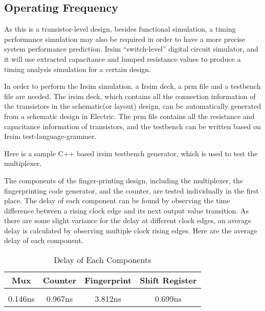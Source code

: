 \documentclass[10pt,journal,compsoc]{IEEEtran}
\begin{document}
\subsection{Operating Frequency}
As this is a transistor-level design, besides functional simulation, a timing performance simulation may also be required in order to have a more precise system performance prediction. Irsim “switch-level” digital circuit simulator, and it will use extracted capacitance and lumped resistance values to produce a timing analysis simulation for a certain design.

In order to perform the Irsim simulation, a Irsim deck, a prm file and a testbench file are needed. The irsim deck, which contains all the connection information of the transistors in the schematic(or layout) design, can be automatically generated from a schematic design in Electric. The prm file contains all the resistance and capacitance information of transistors, and the testbench can be written based on Irsim test-language-grammer.

Here is a sample C++ based irsim testbench generator, which is used to test the multiplexer.

The components of the finger-printing design, including the multiplexer, the fingerprinting code generator, and the counter, are tested individually in the first place. The delay of each component can be found by observing the time difference between a rising clock edge and its next output value transition. As there are some slight variance for the delay at different clock edges, an average delay is calculated by observing multiple clock rising edges. 
Here are the average delay of each component. 

\begin{table}[ht] 
\caption{Delay of Each Components} %
\centering %
\begin{tabular}{c c c c } %
\hline\hline %
Mux & Counter & Fingerprint & Shift Register\\ [0.5ex] %
\hline %
\\ [0.2 ex]
0.146ns & 0.967ns & 3.812ns & 0.699ns \\ [1ex] %

\hline %
\end{tabular} 
\label{table:nonlin} %
\end{table} 
\end{document}
